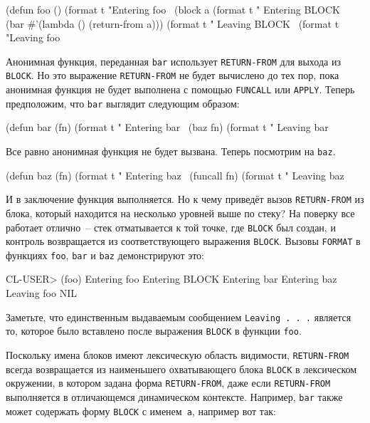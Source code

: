 \begin{myverb}
(defun foo ()
  (format t "Entering foo~%
  (block a
    (format t " Entering BLOCK~%
    (bar #'(lambda () (return-from a)))
    (format t " Leaving BLOCK~%
  (format t "Leaving foo~%
\end{myverb}

Анонимная функция, переданная \lstinline{bar} использует \lstinline{RETURN-FROM} для выхода из
\lstinline{BLOCK}. Но это выражение \lstinline{RETURN-FROM} не будет вычислено до тех пор, пока
анонимная функция не будет выполнена с помощью \lstinline{FUNCALL} или \lstinline{APPLY}. Теперь
предположим, что \lstinline{bar} выглядит следующим образом:

\begin{myverb}
(defun bar (fn)
  (format t "  Entering bar~%
  (baz fn)
  (format t "  Leaving bar~%
\end{myverb}

Все равно анонимная функция не будет вызвана. Теперь посмотрим на \lstinline{baz}.

\begin{myverb}
(defun baz (fn)
  (format t "   Entering baz~%
  (funcall fn)
  (format t "   Leaving baz~%
\end{myverb}

И в заключение функция выполняется. Но к чему приведёт вызов \lstinline{RETURN-FROM} из блока,
который находится на несколько уровней выше по стеку? На поверку все работает отлично~--
стек отматывается к той точке, где \lstinline{BLOCK} был создан, и контроль возвращается из
соответствующего выражения \lstinline{BLOCK}. Вызовы \lstinline{FORMAT} в функциях \lstinline{foo},
\lstinline{bar} и \lstinline{baz} демонстрируют это:

\begin{myverb}
CL-USER> (foo)
Entering foo
 Entering BLOCK
  Entering bar
   Entering baz
Leaving foo
NIL
\end{myverb}

Заметьте, что единственным выдаваемым сообщением \lstinline{Leaving . . .} является то, которое
было вставлено после выражения \lstinline{BLOCK} в функции \lstinline{foo}.

Поскольку имена блоков имеют лексическую область видимости, \lstinline{RETURN-FROM} всегда
возвращается из наименьшего охватывающего блока \lstinline{BLOCK} в лексическом окружении, в
котором задана форма \lstinline{RETURN-FROM}, даже если \lstinline{RETURN-FROM} выполняется в
отличающемся динамическом контексте. Например, \lstinline{bar} также может содержать форму
\lstinline{BLOCK} с именем~\lstinline{a}, например вот так:

